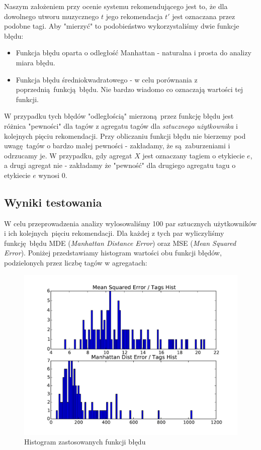 \documentclass[a4paper,10pt]{article}
\begin{document}
Naszym założeniem przy ocenie systemu rekomendującego jest to, że dla dowolnego utworu muzycznego $t$ jego rekomendacja $t\prime$ jest oznaczana przez podobne tagi. Aby "mierzyć" to podobieństwo wykorzystaliśmy dwie funkcje błędu:

\begin{itemize}
 \item Funkcja błędu oparta o odległość Manhattan - naturalna i prosta do analizy miara błędu.
 \item Funkcja błędu średniokwadratowego - w celu porównania z poprzednią funkcją błędu. Nie bardzo wiadomo co oznaczają wartości tej funkcji.
\end{itemize}

W przypadku tych błędów "odległością" mierzoną przez funkcję błędu jest różnica "pewności" dla tagów z agregatu tagów dla \textit{sztucznego użytkownika} i kolejnych pięciu rekomendacji. Przy obliczaniu funkcji błędu nie bierzemy pod uwagę tagów o bardzo małej pewności - zakładamy, że są zaburzeniami i odrzucamy je. W przypadku, gdy agregat $X$ jest oznaczany tagiem o etykiecie $e$, a drugi agregat nie - zakładamy że "pewność" dla drugiego agregatu tagu o etykiecie $e$ wynosi $0$.

\subsection{Wyniki testowania}

W celu przeprowadzenia analizy wylosowaliśmy 100 par sztucznych użytkowników i ich kolejnych pięciu rekomendacji. Dla każdej z tych par wyliczyliśmy funkcję błędu MDE (\textit{Manhattan Distance Error}) oraz MSE (\textit{Mean Squared Error}). Poniżej przedstawiamy histogram wartości obu funkcji błędów, podzielonych przez liczbę tagów w agregatach:

\begin{figure}[h]
\includegraphics[width=\textwidth,height=\textheight,keepaspectratio]{mde_mse_hist_subset.pdf}
\caption{Histogram zastosowanych funkcji błędu}
\end{figure}
\end{document}
